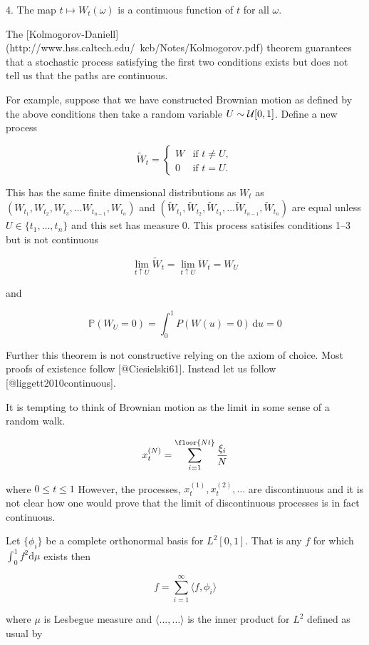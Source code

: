 \documentclass{article}
\begin{document}
4. The map $t \mapsto W_t(\omega)$ is a continuous function of $t$ for
all $\omega$.

The
[Kolmogorov-Daniell](http://www.hss.caltech.edu/~kcb/Notes/Kolmogorov.pdf)
theorem guarantees that a stochastic process satisfying the first two
conditions exists but does not tell us that the paths are
continuous.

For example, suppose that we have constructed Brownian motion as
defined by the above conditions then take a random variable $U \sim {\cal{U}}[0,1]$. Define a new process

$$
\tilde{W}_t =
  \begin{cases}
    W & \text{if } t \neq U, \\
    0 & \text{if } t = U.
  \end{cases}
$$

This has the same finite dimensional distributions as $W_t$ as
$(W_{t_1}, W_{t_2}, W_{t_3}, \ldots W_{t_{n-1}}, W_{t_n})$ and
$(\tilde{W}_{t_1}, \tilde{W}_{t_2}, \tilde{W}_{t_3}, \ldots
\tilde{W}_{t_{n-1}}, \tilde{W}_{t_n})$ are equal unless $U \in \{t_1,
\ldots, t_n\}$ and this set has measure 0. This process satisifes
conditions 1--3 but is not continuous

$$
\lim_{t \uparrow U} \tilde{W}_t = \lim_{t \uparrow U} W_t = W_U
$$

and

$$
\mathbb{P}(W_U = 0) = \int_0^1 P(W(u)=0)\,\mathrm du=0
$$

Further this theorem is not constructive relying on the axiom of
choice. Most proofs of existence follow [@Ciesielski61]. Instead let
us follow [@liggett2010continuous].

It is tempting to think of Brownian motion as the limit in some sense
of a random walk.

$$
x_t^{(N)} = \sum_{i=1}^\floor{Nt}\frac{\xi_i}{N}
$$

where $0 \le t \le 1$ However, the processes, $x_t^{(1)}, x_t^{(2)},
\ldots$ are discontinuous and it is not clear how one would prove that
the limit of discontinuous processes is in fact continuous.

Let $\{\phi_i\}$ be a complete orthonormal basis for $L^2[0,1]$. That
is any $f$ for which $\int_0^1 f^2 \mathrm{d}\mu$ exists then

$$
f = \sum_{i=1}^\infty \langle f, \phi_i\rangle
$$

where $\mu$ is Lesbegue measure and $\langle\ldots,\ldots\rangle$ is
the inner product for $L^2$ defined as usual by
\end{document}
